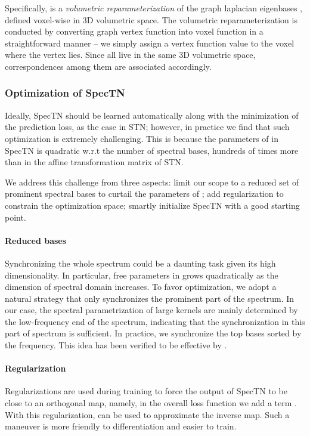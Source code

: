 \documentclass[10pt,twocolumn,letterpaper]{article}
\newcommand{\mypara}{\vspace*{-15pt}\paragraph}
\begin{document}
Specifically,  is a \emph{volumetric reparameterization} of the graph laplacian eigenbases , defined voxel-wise in 3D volumetric space. The volumetric reparameterization is conducted by converting graph vertex function  into voxel function  in a straightforward manner -- we simply assign a vertex function value to the voxel where the vertex lies. Since all  live in the same 3D volumetric space, correspondences among them are associated accordingly.



\subsubsection{Optimization of SpecTN}
Ideally, SpecTN should be learned automatically along with the minimization of the prediction loss, as the case in STN; however, in practice we find that such optimization is extremely challenging. This is because the parameters of  in SpecTN is quadratic w.r.t the number of spectral bases, hundreds of times more than in the affine transformation matrix of STN. 

We address this challenge from three aspects: limit our scope to a reduced set of prominent spectral bases to curtail the parameters of ; add regularization to constrain the optimization space; smartly initialize SpecTN with a good starting point.  


\mypara{Reduced bases} Synchronizing the whole spectrum could be a daunting task given its high dimensionality. In particular, free parameters in  grows quadratically as the dimension of spectral domain increases. To favor optimization, we adopt a natural strategy that only synchronizes the prominent part of the spectrum. In our case, the spectral parametrization of large kernels are mainly determined by the low-frequency end of the spectrum, indicating that the synchronization in this part of spectrum is sufficient. In practice, we synchronize the top  bases sorted by the frequency. This idea has been verified to be effective by \cite{ovsjanikov2012functional}.





\mypara{Regularization}
Regularizations are used during training to force the output  of SpecTN to be close to an orthogonal map, namely, in the overall loss function we add a term . With this regularization,  can be used to approximate the inverse map. Such a maneuver is more friendly to differentiation and easier to train. 
\end{document}
